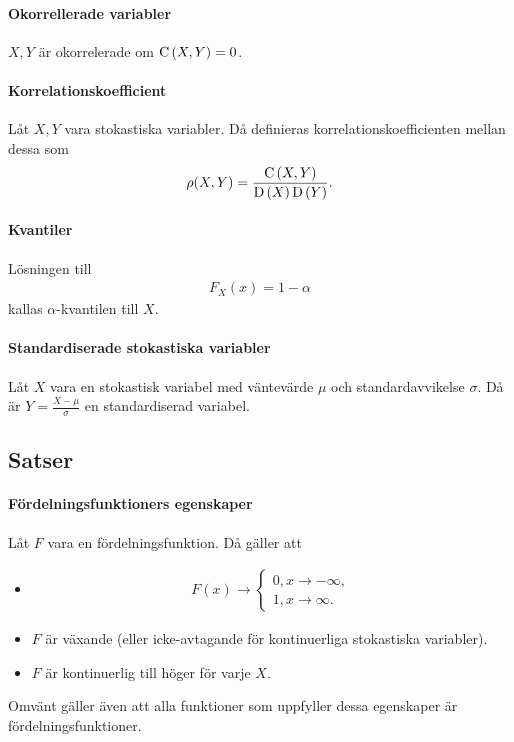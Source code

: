 \paragraph{Okorrellerade variabler}
$X, Y$ är okorrelerade om $\text{C}\left(X, Y\right) = 0$.

\paragraph{Korrelationskoefficient}
Låt $X, Y$ vara stokastiska variabler. Då definieras korrelationskoefficienten mellan dessa som
\begin{align*}
	\rho(X, Y) = \frac{\text{C}\left(X, Y\right)}{\text{D}\left(X\right)\text{D}\left(Y\right)}.
\end{align*}

\paragraph{Kvantiler}
Lösningen till
\begin{align*}
	F_{X}(x) = 1 - \alpha
\end{align*}
kallas $\alpha$-kvantilen till $X$.

\paragraph{Standardiserade stokastiska variabler}
Låt $X$ vara en stokastisk variabel med väntevärde $\mu$ och standardavvikelse $\sigma$. Då är $Y = \frac{X - \mu}{\sigma}$ en standardiserad variabel.

\subsection{Satser}

\paragraph{Fördelningsfunktioners egenskaper}
Låt $F$ vara en fördelningsfunktion. Då gäller att
\begin{itemize}
	\item
	\begin{align*}
		F(x)\to
		\begin{cases}
			0, x\to -\infty, \\
			1, x\to\infty.
		\end{cases}
	\end{align*}
	\item $F$ är växande (eller icke-avtagande för kontinuerliga stokastiska variabler).
	\item $F$ är kontinuerlig till höger för varje $X$.
\end{itemize}
Omvänt gäller även att alla funktioner som uppfyller dessa egenskaper är fördelningsfunktioner.

